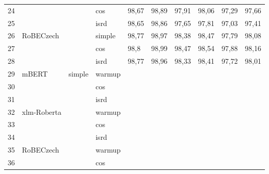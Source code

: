 \begin{table}
{\begin{tabular}{|l|l|l|l||llllll|}
24 &                              &                         & cos    & 98,67  & 98,89   & 97,91   & 98,06    & 97,29     & 97,66      \\ \cline{1-1} \cline{4-10} 
25 &                              &                         & isrd   & 98,65  & 98,86   & 97,65   & 97,81    & 97,03     & 97,41      \\ \cline{1-2} \cline{4-10} 
26 & \multirow{3}{*}{RoBECzech}   &                         & simple & 98,77  & 98,97   & 98,38   & 98,47    & 97,79     & 98,08      \\ \cline{1-1} \cline{4-10} 
27 &                              &                         & cos    & 98,8   & 98,99   & 98,47   & 98,54    & 97,88     & 98,16      \\ \cline{1-1} \cline{4-10} 
28 &                              &                         & isrd   & 98,77  & 98,96   & 98,33   & 98,41    & 97,72     & 98,01      \\ \hline
29 & \multirow{3}{*}{mBERT}       & \multirow{9}{*}{simple} & warmup &        &         &         &          &           &            \\ \cline{1-1} \cline{4-10} 
30 &                              &                         & cos    &        &         &         &          &           &            \\ \cline{1-1} \cline{4-10} 
31 &                              &                         & isrd   &        &         &         &          &           &            \\ \cline{1-2} \cline{4-10} 
32 & \multirow{3}{*}{xlm-Roberta} &                         & warmup &        &         &         &          &           &            \\ \cline{1-1} \cline{4-10} 
33 &                              &                         & cos    &        &         &         &          &           &            \\ \cline{1-1} \cline{4-10} 
34 &                              &                         & isrd   &        &         &         &          &           &            \\ \cline{1-2} \cline{4-10} 
35 & \multirow{3}{*}{RoBECzech}   &                         & warmup &        &         &         &          &           &            \\ \cline{1-1} \cline{4-10} 
36 &                              &                         & cos    &        &         &         &          &           &            \\ \cline{1-1} \cline{4-10} 

\end{tabular}}
\end{table}
